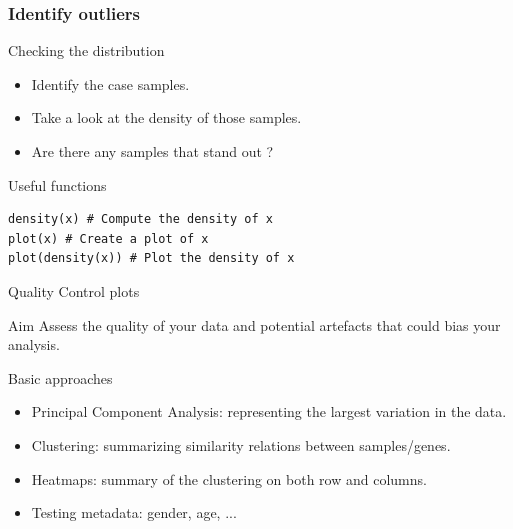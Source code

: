 \documentclass[10pt]{beamer}
\newenvironment{xframe}[2][]
  {\begin{frame}[fragile,environment=xframe,#1]
  \frametitle{#2}}
  {\end{frame}}
\begin{document}
\begin{xframe}{Identify outliers}
  \begin{block}{Checking the distribution}
    \begin{itemize}
      \item Identify the {\sf case} samples. 
      \item Take a look at the density of those samples.
      \item Are there any samples that stand out ?
    \end{itemize}
  \end{block}
  \begin{exampleblock}{Useful functions}
\begin{verbatim}
density(x) # Compute the density of x
plot(x) # Create a plot of x
plot(density(x)) # Plot the density of x
\end{verbatim}
  \end{exampleblock}
\end{xframe}


\begin{frame}{Quality Control plots}
  \begin{block}{Aim}
    Assess the quality of your data and potential artefacts that could bias your analysis.
  \end{block}
  \begin{block}{Basic approaches}
    \begin{itemize}
    \item Principal Component Analysis: representing the largest variation in the data.
    \item Clustering: summarizing similarity relations between samples/genes.
    \item Heatmaps: summary of the clustering on both row and columns.
    \item Testing metadata: gender, age, ...
    \end{itemize}
  \end{block}
\end{frame}

\end{document}
